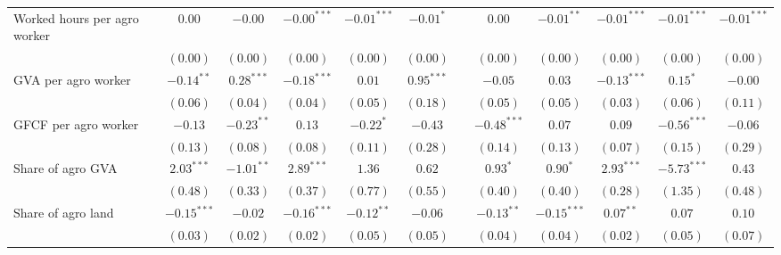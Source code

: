 \begin{table}
\begin{center}
\begin{tabular}{l c c c c c c c c c c c c}
Worked hours per agro worker      &               & $0.00$        & $-0.00$       & $-0.00^{***}$  & $-0.01^{***}$ & $-0.01^{*}$   &               & $0.00$        & $-0.01^{**}$  & $-0.01^{***}$ & $-0.01^{***}$ & $-0.01^{***}$  \\
                                  &               & $(0.00)$      & $(0.00)$      & $(0.00)$       & $(0.00)$      & $(0.00)$      &               & $(0.00)$      & $(0.00)$      & $(0.00)$      & $(0.00)$      & $(0.00)$       \\
GVA per agro worker               &               & $-0.14^{**}$  & $0.28^{***}$  & $-0.18^{***}$  & $0.01$        & $0.95^{***}$  &               & $-0.05$       & $0.03$        & $-0.13^{***}$ & $0.15^{*}$    & $-0.00$        \\
                                  &               & $(0.06)$      & $(0.04)$      & $(0.04)$       & $(0.05)$      & $(0.18)$      &               & $(0.05)$      & $(0.05)$      & $(0.03)$      & $(0.06)$      & $(0.11)$       \\
GFCF per agro worker              &               & $-0.13$       & $-0.23^{**}$  & $0.13$         & $-0.22^{*}$   & $-0.43$       &               & $-0.48^{***}$ & $0.07$        & $0.09$        & $-0.56^{***}$ & $-0.06$        \\
                                  &               & $(0.13)$      & $(0.08)$      & $(0.08)$       & $(0.11)$      & $(0.28)$      &               & $(0.14)$      & $(0.13)$      & $(0.07)$      & $(0.15)$      & $(0.29)$       \\
Share of agro GVA                 &               & $2.03^{***}$  & $-1.01^{**}$  & $2.89^{***}$   & $1.36$        & $0.62$        &               & $0.93^{*}$    & $0.90^{*}$    & $2.93^{***}$  & $-5.73^{***}$ & $0.43$         \\
                                  &               & $(0.48)$      & $(0.33)$      & $(0.37)$       & $(0.77)$      & $(0.55)$      &               & $(0.40)$      & $(0.40)$      & $(0.28)$      & $(1.35)$      & $(0.48)$       \\
Share of agro land                &               & $-0.15^{***}$ & $-0.02$       & $-0.16^{***}$  & $-0.12^{**}$  & $-0.06$       &               & $-0.13^{**}$  & $-0.15^{***}$ & $0.07^{**}$   & $0.07$        & $0.10$         \\
                                  &               & $(0.03)$      & $(0.02)$      & $(0.02)$       & $(0.05)$      & $(0.05)$      &               & $(0.04)$      & $(0.04)$      & $(0.02)$      & $(0.05)$      & $(0.07)$       \\

\end{tabular}
\end{center}
\end{table}
